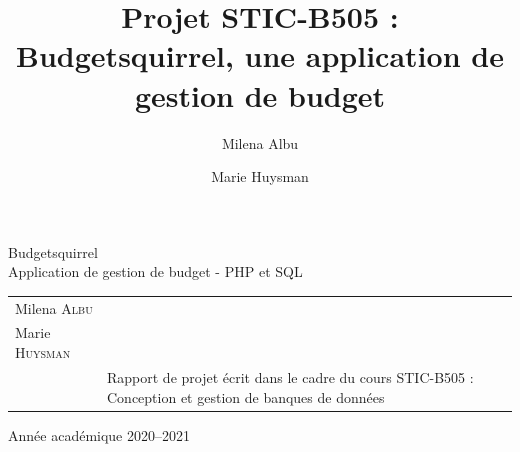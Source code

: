 \documentclass[a4paper,12pt]{article}
\title{Projet STIC-B505 : Budgetsquirrel, une application de gestion de budget}
\author{Milena Albu \and Marie Huysman} %
\date{} %
\begin{document}
\sloppy

\begin{titlepage} %
\singlespacing %

\begin{figure}[h]
\noindent
{}
\end{figure}

\vfill %


\begin{center}
\Huge{Budgetsquirrel}\\ %
\LARGE{Application de gestion de budget - PHP et SQL}
\vspace{.5cm}
\end{center}

\vfill

\begin{tabular}{b{5.5cm}b{7.5cm}} %
 \\ Milena \textsc{Albu} \\ Marie \textsc{Huysman} \\ & Rapport de projet écrit dans le cadre du cours STIC-B505 : Conception et gestion de banques de données \\
\end{tabular}

\vfill

\begin{center}
Année académique 2020--2021 %
\end{center}

\end{titlepage}

\thispagestyle{plain}
\end{document}
